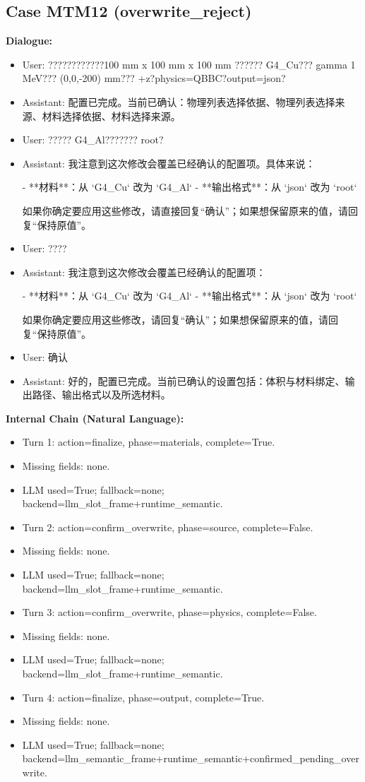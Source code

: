 \documentclass[11pt]{ctexart}
\begin{document}
\subsection{Case MTM12 (overwrite\_reject)}
\textbf{Dialogue:}
\begin{itemize}
\item User: ????????????100 mm x 100 mm x 100 mm ?????? G4\_Cu??? gamma 1 MeV??? (0,0,-200) mm??? +z?physics=QBBC?output=json?
\item Assistant: 配置已完成。当前已确认：物理列表选择依据、物理列表选择来源、材料选择依据、材料选择来源。
\item User: ????? G4\_Al??????? root?
\item Assistant: 我注意到这次修改会覆盖已经确认的配置项。具体来说：

- **材料**：从 `G4\_Cu` 改为 `G4\_Al`
- **输出格式**：从 `json` 改为 `root`

如果你确定要应用这些修改，请直接回复“确认”；如果想保留原来的值，请回复“保持原值”。
\item User: ????
\item Assistant: 我注意到这次修改会覆盖已经确认的配置项：

- **材料**：从 `G4\_Cu` 改为 `G4\_Al`
- **输出格式**：从 `json` 改为 `root`

如果你确定要应用这些修改，请回复“确认”；如果想保留原来的值，请回复“保持原值”。
\item User: 确认
\item Assistant: 好的，配置已完成。当前已确认的设置包括：体积与材料绑定、输出路径、输出格式以及所选材料。
\end{itemize}
\textbf{Internal Chain (Natural Language):}
\begin{itemize}
\item Turn 1: action=finalize, phase=materials, complete=True.
\item Missing fields: none.
\item LLM used=True; fallback=none; backend=llm\_slot\_frame+runtime\_semantic.
\item Turn 2: action=confirm\_overwrite, phase=source, complete=False.
\item Missing fields: none.
\item LLM used=True; fallback=none; backend=llm\_slot\_frame+runtime\_semantic.
\item Turn 3: action=confirm\_overwrite, phase=physics, complete=False.
\item Missing fields: none.
\item LLM used=True; fallback=none; backend=llm\_slot\_frame+runtime\_semantic.
\item Turn 4: action=finalize, phase=output, complete=True.
\item Missing fields: none.
\item LLM used=True; fallback=none; backend=llm\_semantic\_frame+runtime\_semantic+confirmed\_pending\_overwrite.
\end{itemize}
\end{document}
